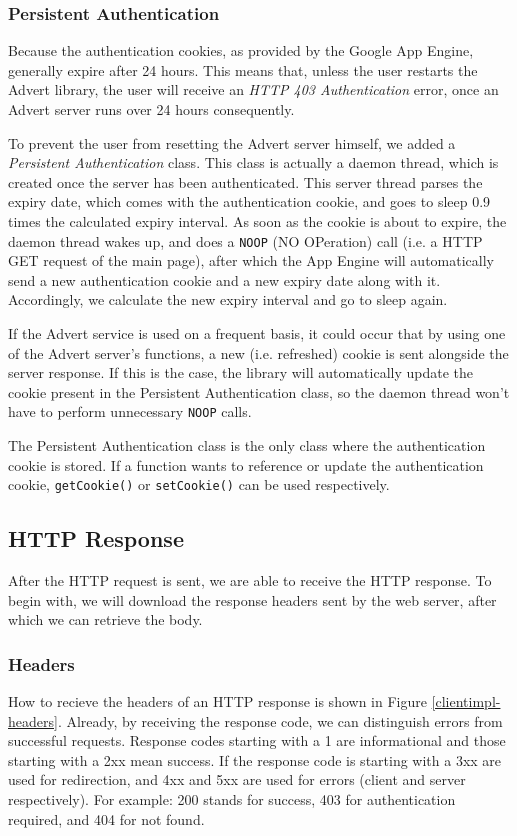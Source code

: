 \subsubsection{Persistent Authentication}
Because the authentication cookies, as provided by the Google App Engine,
generally expire after 24 hours. This means that, unless the user restarts the
Advert library, the user will receive an \emph{HTTP 403 Authentication} error,
once an Advert server runs over 24 hours consequently. 

To prevent the user from resetting the Advert server himself, we added a
\emph{Persistent Authentication} class. This class is actually a daemon thread,
which is created once the server has been authenticated. This server thread
parses the expiry date, which comes with the authentication cookie, and goes to
sleep 0.9 times the calculated expiry interval. As soon as the cookie is about
to expire, the daemon thread wakes up, and does a \texttt{NOOP} (NO OPeration)
call (i.e. a HTTP GET request of the main page), after which the App Engine
will automatically send a new authentication cookie and a new expiry date along
with it. Accordingly, we calculate the new expiry interval and go to sleep
again.

If the Advert service is used on a frequent basis, it could occur that by using
one of the Advert server's functions, a new (i.e. refreshed) cookie is sent
alongside the server response. If this is the case, the library will
automatically update the cookie present in the Persistent Authentication class,
so the daemon thread won't have to perform unnecessary \texttt{NOOP} calls.

The Persistent Authentication class is the only class where the authentication
cookie is stored. If a function wants to reference or update the authentication
cookie, \texttt{getCookie()} or \texttt{setCookie()} can be used respectively.

\subsection{HTTP Response}
After the HTTP request is sent, we are able to receive the HTTP response. To
begin with, we will download the response headers sent by the web server, after
which we can retrieve the body.

\subsubsection{Headers}
How to recieve the headers of an HTTP response is shown in Figure
\ref{clientimpl-headers}. Already, by receiving the response code, we can
distinguish errors from successful requests. Response codes starting with a 1 are
informational and those starting with a 2xx mean success. If the response code
is starting with a 3xx are used for redirection, and 4xx and 5xx are used for
errors (client and server respectively). For example: 200 stands for success, 403 for
authentication required, and 404 for not found.

